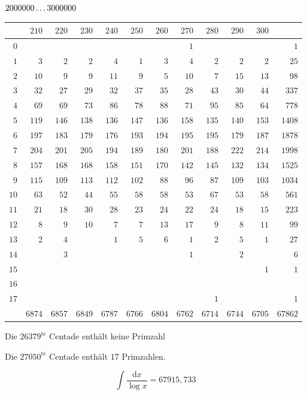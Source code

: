 \par\medskip
\noindent\begin{minipage}{\linewidth}\centering
{}
\(2000000\mathinner{.\,.\,.}3000000\)\par\smallskip
\begingroup\fontsize{10}{10.5}\selectfont\setlength{\tabcolsep}{3.5pt}\renewcommand{\arraystretch}{1}
\begin{tabular}{r|rrrrrrrrrr|r}\hline
 & $210$ & $220$ & $230$ & $240$ & $250$ & $260$ & $270$ & $280$ & $290$ & $300$ &  \\ \hline
$0$ &  &  &  &  &  &  & $1$ &  &  &  & $1$ \\
$1$ & $3$ & $2$ & $2$ & $4$ & $1$ & $3$ & $4$ & $2$ & $2$ & $2$ & $25$ \\
$2$ & $10$ & $9$ & $9$ & $11$ & $9$ & $5$ & $10$ & $7$ & $15$ & $13$ & $98$ \\
$3$ & $32$ & $27$ & $29$ & $32$ & $37$ & $35$ & $28$ & $43$ & $30$ & $44$ & $337$ \\
$4$ & $69$ & $69$ & $73$ & $86$ & $78$ & $88$ & $71$ & $95$ & $85$ & $64$ & $778$ \\
$5$ & $119$ & $146$ & $138$ & $136$ & $147$ & $136$ & $158$ & $135$ & $140$ & $153$ & $1408$ \\
$6$ & $197$ & $183$ & $179$ & $176$ & $193$ & $194$ & $195$ & $195$ & $179$ & $187$ & $1878$ \\
$7$ & $204$ & $201$ & $205$ & $194$ & $189$ & $180$ & $201$ & $188$ & $222$ & $214$ & $1998$ \\
$8$ & $157$ & $168$ & $168$ & $158$ & $151$ & $170$ & $142$ & $145$ & $132$ & $134$ & $1525$ \\
$9$ & $115$ & $109$ & $113$ & $112$ & $102$ & $88$ & $96$ & $87$ & $109$ & $103$ & $1034$ \\
$10$ & $63$ & $52$ & $44$ & $55$ & $58$ & $58$ & $53$ & $67$ & $53$ & $58$ & $561$ \\
$11$ & $21$ & $18$ & $30$ & $28$ & $23$ & $24$ & $22$ & $24$ & $18$ & $15$ & $223$ \\
$12$ & $8$ & $9$ & $10$ & $7$ & $7$ & $13$ & $17$ & $9$ & $8$ & $11$ & $99$ \\
$13$ & $2$ & $4$ &  & $1$ & $5$ & $6$ & $1$ & $2$ & $5$ & $1$ & $27$ \\
$14$ &  & $3$ &  &  &  &  & $1$ &  & $2$ &  & $6$ \\
$15$ &  &  &  &  &  &  &  &  &  & $1$ & $1$ \\
$16$ &  &  &  &  &  &  &  &  &  &  &  \\
$17$ &  &  &  &  &  &  &  & $1$ &  &  & $1$ \\
\hline
 & $6874$ & $6857$ & $6849$ & $6787$ & $6766$ & $6804$ & $6762$ & $6714$ & $6744$ & $6705$ & $67862$ \\ \hline
\end{tabular}\par\endgroup
\noindent Die \(26379^{\mathrm{te}}\) Centade enthält keine Primzahl\par
\noindent Die \(27050^{\mathrm{te}}\) Centade enthält \(17\) Primzahlen.\par
\setlength{\abovedisplayskip}{6pt}\setlength{\belowdisplayskip}{4pt}
\[\int\frac{\mathrm{d}x}{\log x}=67915{,}733\]
\end{minipage}
